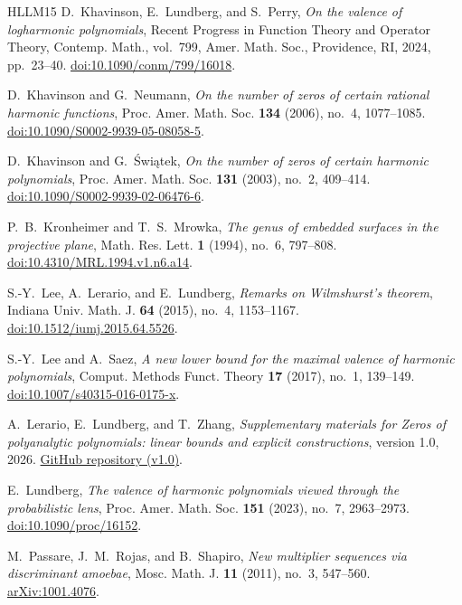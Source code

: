 \documentclass[a4paper]{amsart}
\theoremstyle{remark}
\begin{document}
\begin{thebibliography}{HLLM15}
D.~Khavinson, E.~Lundberg, and S.~Perry,
\emph{On the valence of logharmonic polynomials},
Recent Progress in Function Theory and Operator Theory,
Contemp. Math., vol.~799, Amer. Math. Soc., Providence, RI, 2024, pp.~23--40.
\href{https://doi.org/10.1090/conm/799/16018}{doi:10.1090/conm/799/16018}.

D.~Khavinson and G.~Neumann,
\emph{On the number of zeros of certain rational harmonic functions},
Proc. Amer. Math. Soc. \textbf{134} (2006), no.~4, 1077--1085.
\href{https://doi.org/10.1090/S0002-9939-05-08058-5}{doi:10.1090/S0002-9939-05-08058-5}.

D.~Khavinson and G.~\'{S}wi\k{a}tek,
\emph{On the number of zeros of certain harmonic polynomials},
Proc. Amer. Math. Soc. \textbf{131} (2003), no.~2, 409--414.
\href{https://doi.org/10.1090/S0002-9939-02-06476-6}{doi:10.1090/S0002-9939-02-06476-6}.

P.~B.~Kronheimer and T.~S.~Mrowka,
\emph{The genus of embedded surfaces in the projective plane},
Math. Res. Lett. \textbf{1} (1994), no.~6, 797--808.
\href{https://doi.org/10.4310/MRL.1994.v1.n6.a14}{doi:10.4310/MRL.1994.v1.n6.a14}.

S.-Y.~Lee, A.~Lerario, and E.~Lundberg,
\emph{Remarks on Wilmshurst's theorem},
Indiana Univ. Math. J. \textbf{64} (2015), no.~4, 1153--1167.
\href{https://doi.org/10.1512/iumj.2015.64.5526}{doi:10.1512/iumj.2015.64.5526}.

S.-Y.~Lee and A.~Saez,
\emph{A new lower bound for the maximal valence of harmonic polynomials},
Comput. Methods Funct. Theory \textbf{17} (2017), no.~1, 139--149.
\href{https://doi.org/10.1007/s40315-016-0175-x}{doi:10.1007/s40315-016-0175-x}.

A.~Lerario, E.~Lundberg, and T.~Zhang,
\emph{Supplementary materials for Zeros of polyanalytic polynomials:
linear bounds and explicit constructions}, version 1.0, 2026.
\href{https://github.com/zhangteng2000/polyanalytic-zeros-constructions/tree/v1.0}{GitHub repository (v1.0)}.

E.~Lundberg, \emph{The valence of harmonic polynomials viewed through
the probabilistic lens},
Proc. Amer. Math. Soc. \textbf{151} (2023), no.~7, 2963--2973.
\href{https://doi.org/10.1090/proc/16152}{doi:10.1090/proc/16152}.

M.~Passare, J.~M.~Rojas, and B.~Shapiro,
\emph{New multiplier sequences via discriminant amoebae},
Mosc. Math. J. \textbf{11} (2011), no.~3, 547--560.
\href{https://arxiv.org/abs/1001.4076}{arXiv:1001.4076}.


\end{thebibliography}
\end{document}
